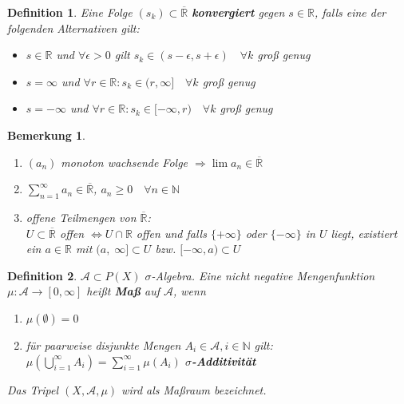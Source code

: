 \documentclass[11pt]{memoir}
\theoremstyle{changebreak}
\newtheorem{Definition}{Definition}[chapter]
\newtheorem{Bemerkung}{Bemerkung}[chapter]
\begin{document}
\begin{Definition}
Eine Folge $(s_{k}) \subset \overline{\mathbb{R}}$ \textbf{konvergiert} gegen $s \in \mathbb{R}$, falls eine der folgenden Alternativen gilt:
\begin{itemize}
	\item  $s \in \mathbb{R}$ und $\forall \epsilon > 0$ gilt $s_{k} \in (s-\epsilon, s+\epsilon) \quad\forall k$ groß genug
	\item $s = \infty$ und $\forall r \in \mathbb{R}: s_{k} \in (r, \infty] \quad \forall k$ groß genug
	\item $s = -\infty$ und $\forall r \in \mathbb{R}: s_k \in [-\infty, r) \quad \forall k$ groß genug
\end{itemize}
\end{Definition}

\begin{Bemerkung}
\begin{enumerate}
	\item $(a_n)$ monoton wachsende Folge
	$\Rightarrow \lim a_n \in \mathbb{\overline{R}}$
	\item $\sum\limits_{n=1}^{\infty} a_n \in \mathbb{\overline{R}}$, $a_n \geq 0 \quad \forall n \in \mathbb{N}$
	\item offene Teilmengen von $\overline{\mathbb{R}}$: \\
	$U \subset \overline{\mathbb{R}} $ offen $\Leftrightarrow U \cap \mathbb{R}$ offen und falls $\{+\infty\}$ oder $\{-\infty\}$ in $U$ liegt, existiert ein $a \in \mathbb{R}$ mit $(a,\; \infty ]\subset U$ bzw. $[-\infty, a) \subset U$
\end{enumerate}
\end{Bemerkung}

\begin{Definition}
$\mathscr{A} \subset P(X)$ $\sigma$-Algebra. Eine nicht negative Mengenfunktion $\mu: \mathscr{A} \rightarrow [0, \infty]$ heißt \textbf{Maß} auf $\mathscr{A}$, wenn
\begin{enumerate}
	\item $\mu(\emptyset) = 0$
	\item für paarweise disjunkte Mengen $A_i \in \mathscr{A}, i \in \mathbb{N}$ gilt: \\
	$\mu\left(\bigcup\limits_{i=1}^{\infty}A_i\right) = \sum\limits_{i=1}^{\infty} \mu(A_i)$ \textbf{$\sigma$-Additivität}
\end{enumerate}
Das Tripel $(X, \mathscr{A}, \mu)$ wird als Maßraum bezeichnet.
\end{Definition}
\end{document}
